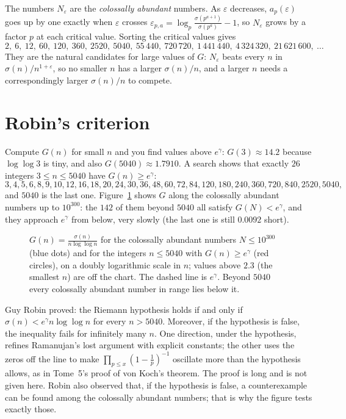 The numbers $N_\varepsilon$ are the \emph{colossally abundant} numbers. As $\varepsilon$ decreases, $a_p(\varepsilon)$ goes up by one exactly when $\varepsilon$ crosses
$\varepsilon_{p,a}=\log_p\frac{\sigma(p^{a+1})}{\sigma(p^a)}-1$, so $N_\varepsilon$ grows by a factor $p$ at each critical value. Sorting the critical values gives
\[
2,\ 6,\ 12,\ 60,\ 120,\ 360,\ 2520,\ 5040,\ 55\,440,\ 720\,720,\ 1\,441\,440,\ 4\,324\,320,\ 21\,621\,600,\ \dots
\]
They are the natural candidates for large values of $G$: $N_\varepsilon$ beats every $n$ in $\sigma(n)/n^{1+\varepsilon}$, so no smaller $n$ has a larger $\sigma(n)/n$,
and a larger $n$ needs a correspondingly larger $\sigma(n)/n$ to compete.

\section{Robin's criterion}

Compute $G(n)$ for small $n$ and you find values above $e^\gamma$: $G(3)\approx14.2$ because $\log\log3$ is tiny, and also $G(5040)\approx1.7910$. A
search shows that exactly $26$ integers $3\le n\le5040$ have $G(n)\ge e^\gamma$:
\[
3,4,5,6,8,9,10,12,16,18,20,24,30,36,48,60,72,84,120,180,240,360,720,840,2520,5040,
\]
and $5040$ is the last one. Figure~\ref{fig:robin} shows $G$ along the colossally abundant numbers up to $10^{300}$: the $142$ of them beyond $5040$ all
satisfy $G(N)<e^\gamma$, and they approach $e^\gamma$ from below, very slowly (the last one is still $0.0092$ short).

\begin{figure}[ht]
\centering
{}
\caption{$G(n)=\frac{\sigma(n)}{n\log\log n}$ for the colossally abundant numbers $N\le10^{300}$ (blue dots) and for the integers $n\le5040$ with $G(n)\ge e^\gamma$
(red circles), on a doubly logarithmic scale in $n$; values above $2.3$ (the smallest $n$) are off the chart. The dashed line is $e^\gamma$. Beyond
$5040$ every colossally abundant number in range lies below it.}
\label{fig:robin}
\end{figure}

\begin{remark}[Robin, 1984]\label{rem:robin}
Guy Robin proved: the Riemann hypothesis holds if and only if $\sigma(n)<e^\gamma n\log\log n$ for every $n>5040$. Moreover, if the hypothesis is false,
the inequality fails for infinitely many $n$. One direction, under the hypothesis, refines Ramanujan's lost argument with explicit constants; the other
uses the zeros off the line to make $\prod_{p\le x}(1-\frac1p)^{-1}$ oscillate more than the hypothesis allows, as in Tome~5's proof of von Koch's
theorem. The proof is long and is not given here. Robin also observed that, if the hypothesis is false, a counterexample can be found among the
colossally abundant numbers; that is why the figure tests exactly those.
\end{remark}

